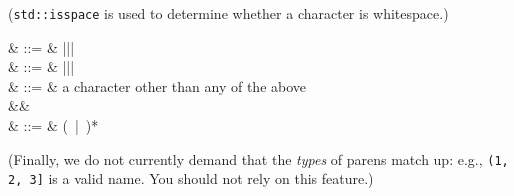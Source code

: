 (\texttt{std::isspace} is used to determine whether a character is
  whitespace.)

\begin{grammar}
    & ::= &  \term{(}\cfgsp |\cfgsp \term{\{}\cfgsp |\cfgsp \term{[}\cfgsp |\cfgsp \term{$<$} \\
   & ::= &  \term{)}\cfgsp |\cfgsp \term{\}}\cfgsp |\cfgsp \term{]}\cfgsp |\cfgsp \term{$>$} \\
   & ::= &  \textrm{a character other than any of the above} \\
&& \\
  & ::= &  \cfgsp  (\ |\ )*\cfgsp  {}
\end{grammar}

(Finally, we do not currently demand that the \emph{types} of parens
  match up: e.g., \texttt{(1, 2, 3]} is a valid name. You should not
    rely on this feature.)
